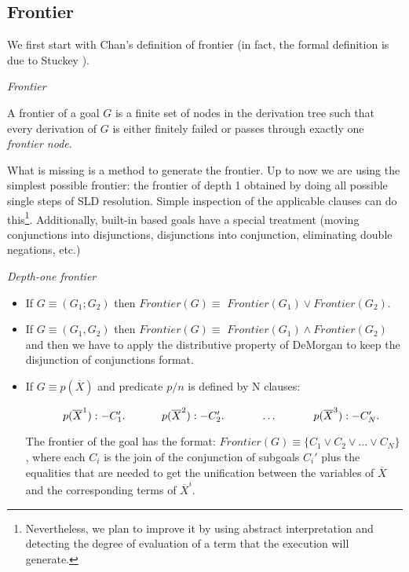 \documentclass{llncs}
\begin{document}

\subsection{Frontier}
\label{frontier}

We first start with Chan's definition of frontier (in fact, 
the formal definition is due to Stuckey \cite{Stuckey95}). 

\begin{definition}{\em Frontier}

A frontier of a goal $G$ is a finite set of nodes in the derivation tree
such that every derivation of $G$ is either finitely failed or passes
through exactly one {\em frontier node}.
\end{definition}

What is missing is a method to generate the frontier.  Up to now we
are using the simplest possible frontier: the frontier of depth 1
obtained by doing all possible single steps of SLD resolution. Simple
inspection of the applicable clauses can do this\footnote{Nevertheless, we
plan to improve it by using abstract interpretation and
detecting the degree of evaluation of a term that the execution will
generate.}.
Additionally, built-in based goals have a special
treatment (moving conjunctions into disjunctions, disjunctions into
conjunction, eliminating double negations, etc.)

\begin{definition}{\em Depth-one frontier}

    \begin{itemize} 

\item If $G \equiv (G_1;G_2) $ then $Frontier(G) \equiv$
$Frontier(G_1) \vee Frontier(G_2)$.

\item If $G \equiv (G_1,G_2) $ then $Frontier(G) \equiv$
  $Frontier(G_1) \wedge Frontier(G_2)$ and then we have to apply the
  distributive property of DeMorgan to keep the disjunction of
  conjunctions format.
  
\item If $G \equiv p( \overline{X}) $ and 
  predicate $p/n$ is defined by N clauses:

$
~~~~~~~~~~p( \overline{X}^1):- C_1'. \\
~~~~~~~~~~p( \overline{X}^2):- C_2'. \\
~~~~~~~~~~\ldots \\
~~~~~~~~~~p( \overline{X}^3):- C_N'. \\
$

The frontier of the goal has the format:
$Frontier(G) \equiv \{C_1 \vee C_2 \vee \ldots \vee C_N\}$, 
where each $C_i$ is the join
of the conjunction of subgoals $C_i'$ plus the equalities that are
needed to get the unification between the variables of $\overline{X}$
and the corresponding terms of $\overline{X}^i$.

    \end{itemize}

\end{definition}
\end{document}
